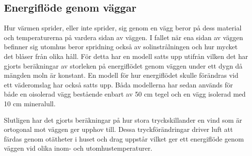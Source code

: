 \subsection{Energiflöde genom väggar}

Hur värmen sprider, eller inte sprider, sig genom en vägg beror på dess material och temperaturerna på vardera sidan av väggen. I fallet när ena sidan av väggen befinner sig utomhus beror spridning också av solinstrålningen och hur mycket det blåser från olika håll. För detta har en modell satts upp utifrån vilken det har gjorts beräkningar av storleken på energiflödet genom väggen under ett dygn då mängden moln är konstant. En modell för hur energiflödet skulle förändras vid ett väderomslag har också satts upp. Båda modellerna har sedan används för både en oisolerad vägg bestående enbart av 50 cm tegel och en vägg isolerad med 10 cm mineralull.

Slutligen har det gjorts beräkningar på hur stora tryckskillander en vind som är ortogonal mot väggen ger upphov till. Dessa tryckförändringar driver luft att färdas genom otätheter i huset och drag uppstår vilket ger ett energiflöde genom väggen vid olika inom- och utomhustemperaturer.





% 



